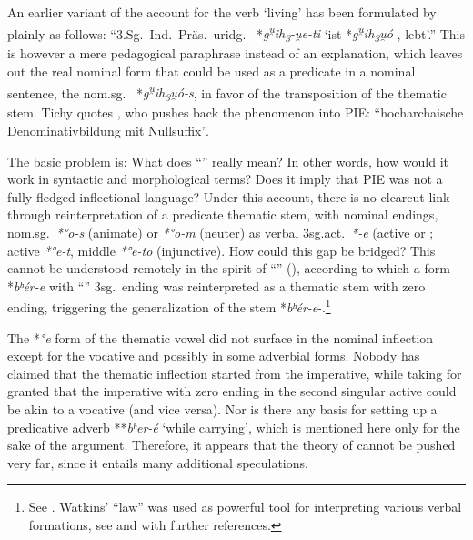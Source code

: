 \documentclass[output=paper,colorlinks,citecolor=brown]{langscibook}
\begin{document}
An earlier variant of the  account for the verb ‘living’ has been formulated by \citet[55]{Tichy2004} plainly as follows: “3.Sg.\ Ind.\ Präs.\ uridg.\  *\textit{g\textsuperscript{u̯}ih\textsubscript{3}-u̯e-ti} ‘ist *\textit{g\textsuperscript{u̯}ih\textsubscript{3}u̯ó}-, lebt’.” This is however a mere pedagogical paraphrase instead of an explanation, which leaves out the real nominal form that could be used as a predicate in a nominal sentence, the nom.sg.\   *\textit{g\textsuperscript{u̯}ih\textsubscript{3}u̯ó-s}, in favor of the transposition of the thematic stem. Tichy quotes \citet[79]{Rix1994}, who pushes back the phenomenon into PIE: “hocharchaische Denominativbildung mit Nullsuffix”.

The basic problem is: What does “” really mean? In other words, how would it work in syntactic and morphological terms? Does it imply that PIE was not a fully-fledged inflectional language?  Under this account, there is no clearcut link through reinterpretation of a predicate thematic stem, with nominal endings, nom.sg.\ \textit{*°o-s} (animate) or \textit{*°o-m} (neuter) as verbal 3sg.act.\ \textit{*-e} (active or ; active \textit{*°e-t}, middle \textit{*°e-to} (injunctive). How could this gap be bridged? This cannot be understood remotely in the spirit of “” (\citealt{Watkins1969}), according to which a form *\textit{bʰér-e} with “” 3sg.\ ending was reinterpreted as a thematic stem with zero ending, triggering the generalization of the stem   *\textit{bʰér-e}-.\footnote{See \citealt[224--227]{Jasanoff2003}. Watkins’ “law” was used as powerful tool for interpreting various verbal formations, see \citealt{Joseph1980} and \citealt{Janse2009} with further references.} 

The *\textit{°e} form of the thematic vowel did not surface in the nominal inflection except for the vocative and possibly in some adverbial forms. Nobody has claimed that the thematic inflection started from the imperative, while taking for granted that the imperative with zero ending in the second singular active could be akin to a vocative (and vice versa). Nor is there any basis for setting up a predicative adverb **\textit{bʰer-é} ‘while carrying’, which is mentioned here only for the sake of the argument. Therefore, it appears that the theory of  cannot be pushed very far, since it entails many additional speculations.  
\end{document}
